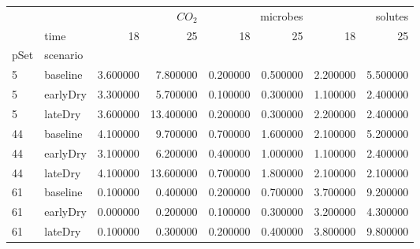 \begin{tabular}{llrrrrrr}
 &  & \multicolumn{2}{r}{$CO_2$} & \multicolumn{2}{r}{microbes} & \multicolumn{2}{r}{solutes} \\
 & time & 18 & 25 & 18 & 25 & 18 & 25 \\
pSet & scenario &  &  &  &  &  &  \\
5 & baseline & 3.600000 & 7.800000 & 0.200000 & 0.500000 & 2.200000 & 5.500000 \\
5 & earlyDry & 3.300000 & 5.700000 & 0.100000 & 0.300000 & 1.100000 & 2.400000 \\
5 & lateDry & 3.600000 & 13.400000 & 0.200000 & 0.300000 & 2.200000 & 2.400000 \\
44 & baseline & 4.100000 & 9.700000 & 0.700000 & 1.600000 & 2.100000 & 5.200000 \\
44 & earlyDry & 3.100000 & 6.200000 & 0.400000 & 1.000000 & 1.100000 & 2.400000 \\
44 & lateDry & 4.100000 & 13.600000 & 0.700000 & 1.800000 & 2.100000 & 2.100000 \\
61 & baseline & 0.100000 & 0.400000 & 0.200000 & 0.700000 & 3.700000 & 9.200000 \\
61 & earlyDry & 0.000000 & 0.200000 & 0.100000 & 0.300000 & 3.200000 & 4.300000 \\
61 & lateDry & 0.100000 & 0.300000 & 0.200000 & 0.400000 & 3.800000 & 9.800000 \\
\end{tabular}

